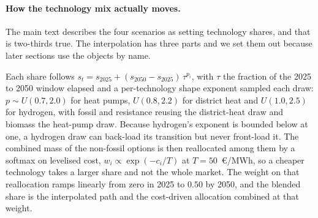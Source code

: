 \begin{table}[htbp]
\centering
\caption{\textbf{Techno-economic parameters by
 heating technology.} In EUR$_{2024}$. Capital cost and efficiency are anchored to the
 Danish Energy Agency Technology Catalogue \citep{DEA2023technology} and cross-checked
 against \citep{JRC2023technology,JRC2023smallheating,IEA2022heatpumps,IRENA2022heatpumpcosts};
 seasonal coefficient of performance values follow \citep{EHPA2023scop}.}
\label{tab:techparams}
 \par{}
\end{table}

\paragraph{How the technology mix actually moves.} The main text describes the four
scenarios as setting technology shares, and that is two-thirds true. The interpolation
has three parts and we set them out because later sections use the objects by name.

Each share follows $s_{t}=s_{2025}+(s_{2050}-s_{2025})\,\tau^{p_{i}}$, with $\tau$ the
fraction of the 2025 to 2050 window elapsed and a per-technology shape exponent sampled
each draw: $p\sim U(0.7,2.0)$ for heat pumps, $U(0.8,2.2)$ for district heat and
$U(1.0,2.5)$ for hydrogen, with fossil and resistance reusing the district-heat draw and
biomass the heat-pump draw. Because hydrogen's exponent is bounded below at one, a
hydrogen draw can back-load its transition but never front-load it. The combined mass of
the non-fossil options is then reallocated among them by a softmax on levelised cost,
$w_{i}\propto\exp(-c_{i}/T)$ at $T=50$~\euro{}/MWh, so a cheaper technology takes a
larger share and not the whole market. The weight on that reallocation ramps linearly from
zero in 2025 to $0.50$ by 2050, and the blended share is the interpolated path and the
cost-driven allocation combined at that weight.

